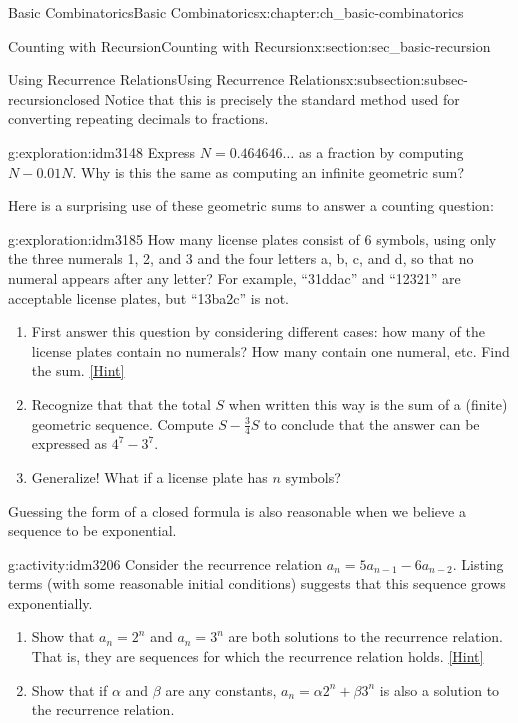 \documentclass[oneside,10pt,]{book}
\numberwithin{equation}{chapter}
\begin{document}
\begin{chapterptx}{Basic Combinatorics}{}{Basic Combinatorics}{}{}{x:chapter:ch_basic-combinatorics}
\begin{sectionptx}{Counting with Recursion}{}{Counting with Recursion}{}{}{x:section:sec_basic-recursion}
\begin{subsectionptx}{Using Recurrence Relations}{}{Using Recurrence Relations}{}{}{x:subsection:subsec-recursionclosed}
Notice that this is precisely the standard method used for converting repeating decimals to fractions.%
\begin{exploration}{}{g:exploration:idm3148}%
Express \(N = 0.464646\ldots\) as a fraction by computing \(N - 0.01N\).  Why is this the same as computing an infinite geometric sum?%
\end{exploration}
Here is a surprising use of these geometric sums to answer a counting question:%
\begin{exploration}{}{g:exploration:idm3185}%
How many license plates consist of 6 symbols, using only the three numerals 1, 2, and 3 and the four letters a, b, c, and d, so that no numeral appears after any letter?  For example, ``31ddac'' and ``12321'' are acceptable license plates, but ``13ba2c'' is not.%
\begin{enumerate}[font=\bfseries,label=(\alph*),ref=\alph*]
\item{}First answer this question by considering different cases: how many of the license plates contain no numerals?  How many contain one numeral, etc.  Find the sum.%
\space\hspace*{0pt}\hfill{\tiny\hyperlink{g:hint:idm3194-back}{[Hint]}}\item{}Recognize that that the total \(S\) when written this way is the sum of a (finite) geometric sequence.  Compute \(S - \frac{3}{4}S\) to conclude that the answer can be expressed as \(4^7 - 3^7\).%
\item{}Generalize! What if a license plate has \(n\) symbols?%
\end{enumerate}
\end{exploration}
Guessing the form of a closed formula is also reasonable when we believe a sequence to be exponential.%
\begin{activity}{}{g:activity:idm3206}%
Consider the recurrence relation \(a_n = 5a_{n-1} - 6a_{n-2}\).  Listing terms (with some reasonable initial conditions) suggests that this sequence grows exponentially.%
\begin{enumerate}[font=\bfseries,label=(\alph*),ref=\alph*]
\item{}Show that \(a_n = 2^n\) and \(a_n = 3^n\) are both solutions to the recurrence relation.  That is, they are sequences for which the recurrence relation holds.%
\space\hspace*{0pt}\hfill{\tiny\hyperlink{g:hint:idm3215-back}{[Hint]}}\item{}Show that if \(\alpha\) and \(\beta\) are any constants, \(a_n = \alpha 2^n + \beta 3^n\) is also a solution to the recurrence relation.%

\end{enumerate}
\end{activity}
\end{subsectionptx}
\end{sectionptx}
\end{chapterptx}
\end{document}

